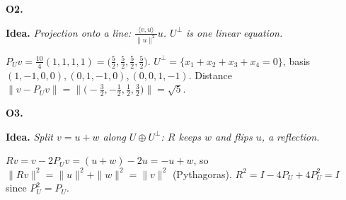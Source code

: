 \documentclass[10pt]{scrartcl}
\newcommand{\ip}[2]{\langle #1,#2\rangle}
\newcommand{\idea}[1]{{\color{OliveGreen!75!black}\textbf{Idea.}} \textit{#1}\par}
\newenvironment{prob}{\par\medskip\noindent\begin{minipage}{\linewidth}\setlength{\parskip}{3pt}}{\end{minipage}\par}
\begin{document}
\begin{prob}
\textbf{O2. }\par 
\idea{Projection onto a line: $\frac{\ip vu}{\|u\|^2}u$. $U^\perp$ is one linear equation.}
$P_Uv=\frac{10}4(1,1,1,1)=\big(\frac52,\frac52,\frac52,\frac52\big)$. $U^\perp=\{x_1+x_2+x_3+x_4=0\}$, basis $(1,-1,0,0),(0,1,-1,0),(0,0,1,-1)$. Distance $\|v-P_Uv\|=\big\|\big(-\frac32,-\frac12,\frac12,\frac32\big)\big\|=\sqrt5$.
\end{prob}

\begin{prob}
\textbf{O3. }\par 
\idea{Split $v=u+w$ along $U\oplus U^\perp$: $R$ keeps $w$ and flips $u$, a reflection.}
$Rv=v-2P_Uv=(u+w)-2u=-u+w$, so $\|Rv\|^2=\|u\|^2+\|w\|^2=\|v\|^2$ (Pythagoras). $R^2=I-4P_U+4P_U^2=I$ since $P_U^2=P_U$.
\end{prob}
\end{document}
